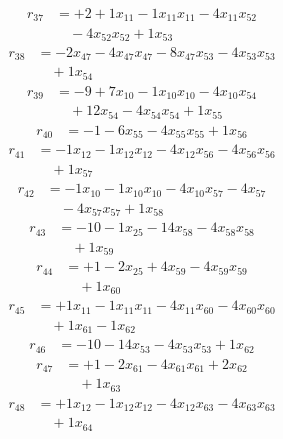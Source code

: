 \[\begin{aligned}
r_{37} &= + 2 + 1 x_{11} - 1 x_{11} x_{11} - 4 x_{11} x_{52} \\
 &\quad - 4 x_{52} x_{52} + 1 x_{53}
\end{aligned}\]
\[\begin{aligned}
r_{38} &= - 2 x_{47} - 4 x_{47} x_{47} - 8 x_{47} x_{53} - 4 x_{53} x_{53} \\
 &\quad + 1 x_{54}
\end{aligned}\]
\[\begin{aligned}
r_{39} &= - 9 + 7 x_{10} - 1 x_{10} x_{10} - 4 x_{10} x_{54} \\
 &\quad + 12 x_{54} - 4 x_{54} x_{54} + 1 x_{55}
\end{aligned}\]
\[\begin{aligned}
r_{40} &= - 1 - 6 x_{55} - 4 x_{55} x_{55} + 1 x_{56}
\end{aligned}\]
\[\begin{aligned}
r_{41} &= - 1 x_{12} - 1 x_{12} x_{12} - 4 x_{12} x_{56} - 4 x_{56} x_{56} \\
 &\quad + 1 x_{57}
\end{aligned}\]
\[\begin{aligned}
r_{42} &= - 1 x_{10} - 1 x_{10} x_{10} - 4 x_{10} x_{57} - 4 x_{57} \\
 &\quad - 4 x_{57} x_{57} + 1 x_{58}
\end{aligned}\]
\[\begin{aligned}
r_{43} &= - 10 - 1 x_{25} - 14 x_{58} - 4 x_{58} x_{58} \\
 &\quad + 1 x_{59}
\end{aligned}\]
\[\begin{aligned}
r_{44} &= + 1 - 2 x_{25} + 4 x_{59} - 4 x_{59} x_{59} \\
 &\quad + 1 x_{60}
\end{aligned}\]
\[\begin{aligned}
r_{45} &= + 1 x_{11} - 1 x_{11} x_{11} - 4 x_{11} x_{60} - 4 x_{60} x_{60} \\
 &\quad + 1 x_{61} - 1 x_{62}
\end{aligned}\]
\[\begin{aligned}
r_{46} &= - 10 - 14 x_{53} - 4 x_{53} x_{53} + 1 x_{62}
\end{aligned}\]
\[\begin{aligned}
r_{47} &= + 1 - 2 x_{61} - 4 x_{61} x_{61} + 2 x_{62} \\
 &\quad + 1 x_{63}
\end{aligned}\]
\[\begin{aligned}
r_{48} &= + 1 x_{12} - 1 x_{12} x_{12} - 4 x_{12} x_{63} - 4 x_{63} x_{63} \\
 &\quad + 1 x_{64}
\end{aligned}\]
